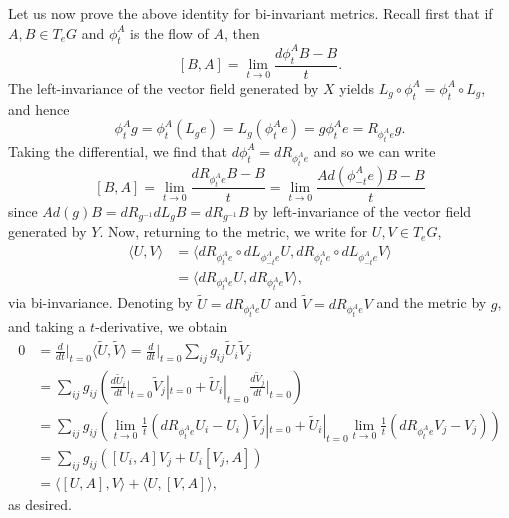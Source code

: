 \documentclass{../mathnotes}
\begin{document}
Let us now prove the above identity for bi-invariant metrics. Recall first that
if $A,B\in T_eG$ and $\phi^A_t$ is the flow of $A$, then
\[ [B,A] = \lim_{t\to 0}\frac{d\phi^A_tB-B}{t}.\]
The left-invariance of the vector field generated by $X$ yields $L_g\circ \phi^A_t=\phi^A_t\circ L_g$,
and hence
\[\phi^A_tg=\phi_t^A(L_ge)=L_g(\phi_t^Ae)=g\phi_t^Ae=R_{\phi_t^Ae}g.\]
Taking the differential, we find that $d\phi_t^A=dR_{\phi_t^Ae}$ and so we can write
\[ [B,A] = \lim_{t\to 0}\frac{dR_{\phi_t^Ae}B-B}{t}=\lim_{t\to 0}\frac{Ad(\phi_{-t}^Ae)B-B}{t}\]
since $Ad(g)B=dR_{g^{-1}}dL_gB=dR_{g^{-1}}B$ by left-invariance of the vector field generated by $Y$.
Now, returning to the metric, we write for $U,V\in T_eG$,
\begin{align*}
    \langle U,V\rangle &= \langle dR_{\phi^A_te}\circ dL_{\phi^A_{-t}e}U, dR_{\phi^A_te}\circ dL_{\phi^A_{-t}e}V\rangle\\
    &= \langle dR_{\phi^A_te} U,dR_{\phi_t^Ae} V\rangle,
\end{align*}
via bi-invariance.
Denoting by $\tilde U=dR_{\phi^A_te}U$ and $\tilde V=dR_{\phi^A_te}V$ and the metric by $g$,
and taking a $t$-derivative, we obtain
\begin{align*}
    0 &= \frac{d}{dt}\bigg|_{t=0} \langle \tilde U,\tilde V\rangle
    = \frac{d}{dt}\bigg|_{t=0}\sum_{ij}g_{ij}\tilde U_i\tilde V_j\\
    &= \sum_{ij}g_{ij}\left( \frac{d\tilde U_i}{dt}\bigg|_{t=0}\tilde V_j|_{t=0}+\tilde U_i|_{t=0}\frac{d\tilde V_j}{dt}\bigg|_{t=0} \right)\\
    &= \sum_{ij}g_{ij}\left( \lim_{t\to 0}\frac{1}{t}(dR_{\phi^A_te}U_i-U_i)\tilde V_j|_{t=0}+\tilde U_i|_{t=0}\lim_{t\to 0}\frac{1}{t}(dR_{\phi_t^Ae}V_j-V_j) \right)\\
    &= \sum_{ij}g_{ij}\left( [U_i,A]V_j+U_i[V_j,A] \right)\\
    &= \langle [U,A],V\rangle + \langle U, [V,A]\rangle,
\end{align*}
as desired.
\end{document}
